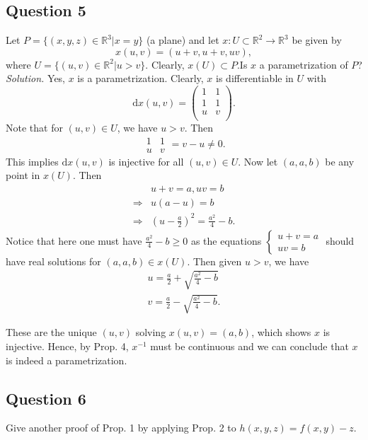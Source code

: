 \documentclass[12pt]{article}
\begin{document}
\subsection*{Question 5}
Let $P= \{(x,y,z)\in \mathbb{R}^3|x= y\}$ (a plane) and let $x:U \subset \mathbb{R}^2 \to \mathbb{R}^3$ be given by \begin{equation*}
    x(u,v) = (u+v,u+v,uv),
\end{equation*}
 where $U=\{(u,v)\in \mathbb{R}^2|u>v\}$. Clearly, $x(U)\subset P$.Is $x$ a parametrization of $P$?\\
 
\textit{Solution.} Yes, $x$ is a parametrization. Clearly, $x$ is differentiable in $U$ with \begin{equation*}
    \mathrm dx(u,v) =\begin{pmatrix}
    1&1\\
    1&1\\
    u&v\\
    \end{pmatrix}.
\end{equation*}
Note that for $(u,v)\in U$, we have $u>v$. Then $$\begin{array}{|cc|}
     1&1  \\
     u&v 
\end{array} = v - u \neq 0.$$
This implies $\mathrm dx(u,v)$ is injective for all $(u,v)\in U$. Now let $(a,a,b)$ be any point in $x(U)$. Then \begin{align*}
    &u+v=a,uv=b\\
    \Rightarrow &u(a-u)=b\\
    \Rightarrow &(u-\frac{a}{2})^2 = \frac{a^2}{4}-b.
\end{align*}
Notice that here one must have $\frac{a^2}{4}-b \geq 0$ as the equations $\begin{cases} u+v=a\\
uv=b
\end{cases}$ should have real solutions for $(a,a,b)\in x(U)$. Then given $u>v$, we have \begin{align*}
    u = \frac{a}{2}+\sqrt{\frac{a^2}{4}-b}\\
    v = \frac{a}{2}-\sqrt{\frac{a^2}{4}-b}.
\end{align*}

These are the unique $(u,v)$ solving $x(u,v)=(a,b)$, which shows $x$ is injective. Hence, by Prop. 4,  $x^{-1}$ must be continuous and we can conclude that $x$ is indeed a parametrization.

\subsection*{Question 6}
Give another proof of Prop. 1 by applying Prop. 2 to $h(x,y,z)=f(x,y)-z$.\\
\end{document}
